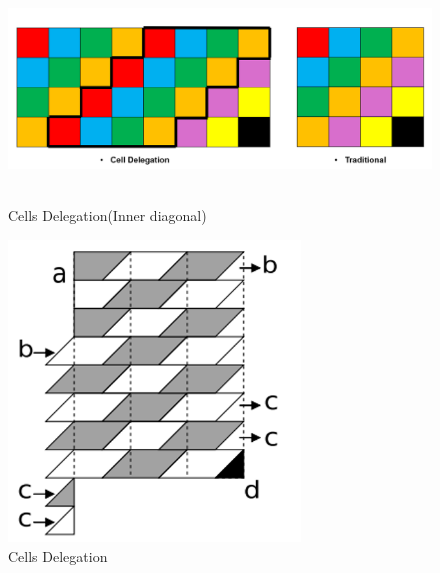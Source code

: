 \documentclass[PhD]{PHlab-thesis}
\begin{document}
\begin{figure}[htbp]
    \centering
    \includegraphics[height=6cm]{figures/Cell Delegation(Inner Block).png}
    \caption{Cells Delegation(Inner diagonal)}
    \label{fig:Cells Delegation(Inner diagonal)}
\end{figure}

\begin{figure}[htbp]
    \centering
    \includegraphics[height=8cm]{figures/Cell Delegation.png}
    \caption{Cells Delegation}
    \label{fig:Cells Delegation}
\end{figure}
\FloatBarrier
\end{document}
